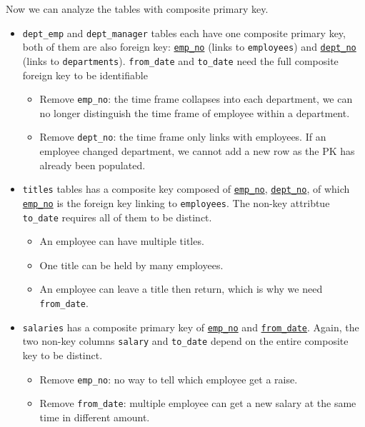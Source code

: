 \documentclass{assignment}
\begin{document}
\noindent Now we can analyze the tables with composite primary key.
\begin{itemize}[noitemsep]
    \item \texttt{dept\_emp} and \texttt{dept\_manager} tables each
        have one composite primary key, both of them are also foreign key:
        \underline{\texttt{emp\_no}} (links to \texttt{employees})
        and \underline{\texttt{dept\_no}} (links to \texttt{departments}).
        \texttt{from\_date} and \texttt{to\_date} need the full
        composite foreign key to be identifiable
        \begin{itemize}[noitemsep]
            \item Remove \texttt{emp\_no}: the time frame collapses
                into each department, we can no longer distinguish
                the time frame of employee within a department.
            \item Remove \texttt{dept\_no}: the time frame only links
                with employees. If an employee changed department, we
                cannot add a new row as the PK has already been populated.
        \end{itemize}

    \item \texttt{titles} tables has a composite key composed of
        \underline{\texttt{emp\_no}}, \underline{\texttt{dept\_no}},
        of which \underline{\texttt{emp\_no}} is the foreign key
        linking to \texttt{employees}. The non-key attribtue
        \texttt{to\_date} requires all of them to be distinct.
        \begin{itemize}[noitemsep]
            \item An employee can have multiple titles.
            \item One title can be held by many employees.
            \item An employee can leave a title then return, which is
                why we need \texttt{from\_date}.
        \end{itemize}

    \item \texttt{salaries} has a composite primary key of
        \underline{\texttt{emp\_no}} and
        \underline{\texttt{from\_date}}. Again, the two
        non-key columns \texttt{salary} and \texttt{to\_date} depend
        on the entire composite key to be distinct.
        \begin{itemize}[noitemsep]
            \item Remove \texttt{emp\_no}: no way to tell which
                employee get a raise.
            \item Remove \texttt{from\_date}: multiple employee can
                get a new salary at the same time in different amount.
        \end{itemize}
\end{itemize}
\end{document}
